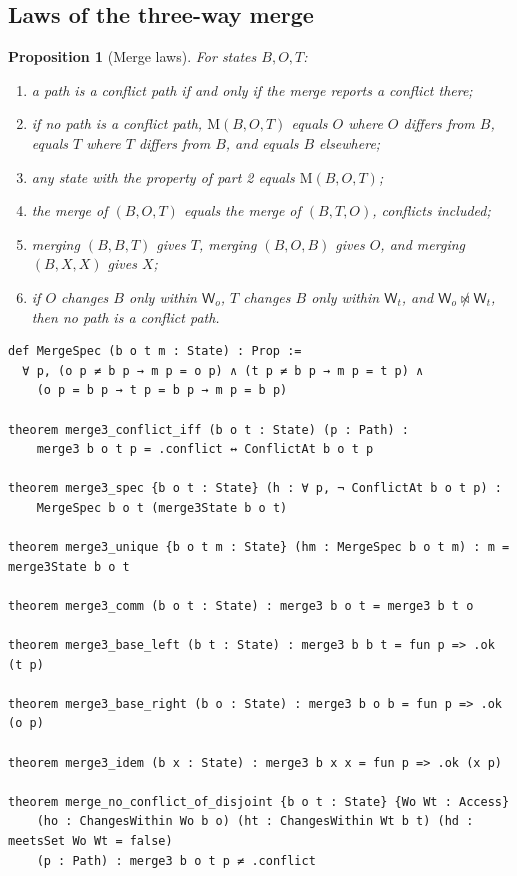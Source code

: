\documentclass[11pt,letterpaper]{article}
\newtheorem{proposition}[theorem]{Proposition}
\theoremstyle{definition}
\theoremstyle{remark}
\newcommand{\W}{\mathsf{W}}
\newcommand{\nmeets}{\not\bowtie}
\newcommand{\op}[1]{\mathrm{#1}}
\newcommand{\mrg}{\op{M}}
\begin{document}
\subsection{Laws of the three-way merge}

\begin{proposition}[Merge laws]
\label{prop:mcbl:laws}
For states $B,O,T$:
\begin{enumerate}
\item a path is a conflict path if and only if the merge reports a conflict there;
\item if no path is a conflict path, $\mrg(B,O,T)$ equals $O$ where $O$ differs from $B$, equals $T$ where $T$ differs from $B$, and equals $B$ elsewhere;
\item any state with the property of part 2 equals $\mrg(B,O,T)$;
\item the merge of $(B,O,T)$ equals the merge of $(B,T,O)$, conflicts included;
\item merging $(B,B,T)$ gives $T$, merging $(B,O,B)$ gives $O$, and merging $(B,X,X)$ gives $X$;
\item if $O$ changes $B$ only within $\W_o$, $T$ changes $B$ only within $\W_t$, and $\W_o\nmeets\W_t$, then no path is a conflict path.
\end{enumerate}
\end{proposition}

\begin{lstlisting}[language=Lean,caption={Laws of the three-way merge (\texttt{YonedaTx/Merge.lean})},label={lst:mcbl:laws}]
def MergeSpec (b o t m : State) : Prop :=
  ∀ p, (o p ≠ b p → m p = o p) ∧ (t p ≠ b p → m p = t p) ∧
    (o p = b p → t p = b p → m p = b p)

theorem merge3_conflict_iff (b o t : State) (p : Path) :
    merge3 b o t p = .conflict ↔ ConflictAt b o t p

theorem merge3_spec {b o t : State} (h : ∀ p, ¬ ConflictAt b o t p) :
    MergeSpec b o t (merge3State b o t)

theorem merge3_unique {b o t m : State} (hm : MergeSpec b o t m) : m = merge3State b o t

theorem merge3_comm (b o t : State) : merge3 b o t = merge3 b t o

theorem merge3_base_left (b t : State) : merge3 b b t = fun p => .ok (t p)

theorem merge3_base_right (b o : State) : merge3 b o b = fun p => .ok (o p)

theorem merge3_idem (b x : State) : merge3 b x x = fun p => .ok (x p)

theorem merge_no_conflict_of_disjoint {b o t : State} {Wo Wt : Access}
    (ho : ChangesWithin Wo b o) (ht : ChangesWithin Wt b t) (hd : meetsSet Wo Wt = false)
    (p : Path) : merge3 b o t p ≠ .conflict
\end{lstlisting}
\end{document}
